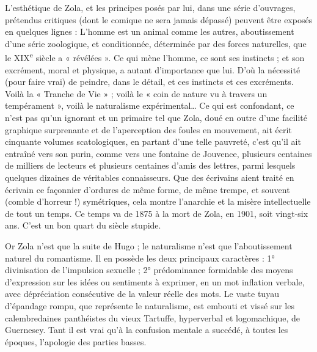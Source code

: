 \documentclass[french,twoside]{book} %
\begin{document}
L’esthétique de Zola, et les principes posés par lui, dans une série d’ouvrages, prétendus critiques (dont le comique ne sera jamais dépassé) peuvent être exposés en quelques lignes : L’homme est un animal comme les autres, aboutissement d’une série zoologique, et conditionnée, déterminée par des forces naturelles, que le XIX\textsuperscript{e} siècle a « révélées ». Ce qui mène l’homme, ce sont ses instincts ; et son excrément, moral et physique, a autant d’importance que lui. D’où la nécessité (pour faire vrai) de peindre, dans le détail, et ces instincts et ces excréments. Voilà la « Tranche de Vie » ; voilà le « coin de nature vu à travers un tempérament », voilà le naturalisme expérimental… Ce qui est confondant, ce n’est pas qu’un ignorant et un primaire tel que Zola, doué en outre d’une facilité graphique surprenante et de l’aperception des foules en mouvement, ait écrit cinquante volumes scatologiques, en partant d’une telle pauvreté, c’est qu’il ait entraîné vers son purin, comme vers une fontaine de Jouvence, plusieurs centaines de milliers de lecteurs et plusieurs centaines d’amis des lettres, parmi lesquels quelques dizaines de véritables connaisseurs. Que des écrivains aient traité en écrivain ce façonnier d’ordures de même forme, de même trempe, et souvent (comble d’horreur !) symétriques, cela montre l’anarchie et la misère intellectuelle de tout un temps. Ce temps va de 1875 à la mort de Zola, en 1901, soit vingt-six ans. C’est un bon quart du siècle stupide.\par
Or Zola n’est que la suite de Hugo ; le naturalisme n’est que l’aboutissement naturel du romantisme. Il en possède les deux principaux caractères : 1° divinisation de l’impulsion sexuelle ; 2° prédominance formidable des moyens d’expression sur les idées ou sentiments à exprimer, en un mot inflation verbale, avec dépréciation consécutive de la valeur réelle des mots. Le vaste tuyau d’épandage rompu, que représente le naturalisme, est embouti et vissé sur les calembredaines panthéistes du vieux Tartuffe, hyperverbal et logomachique, de Guernesey. Tant il est vrai qu’à la confusion mentale a succédé, à toutes les époques, l’apologie des parties basses.\par
\end{document}
